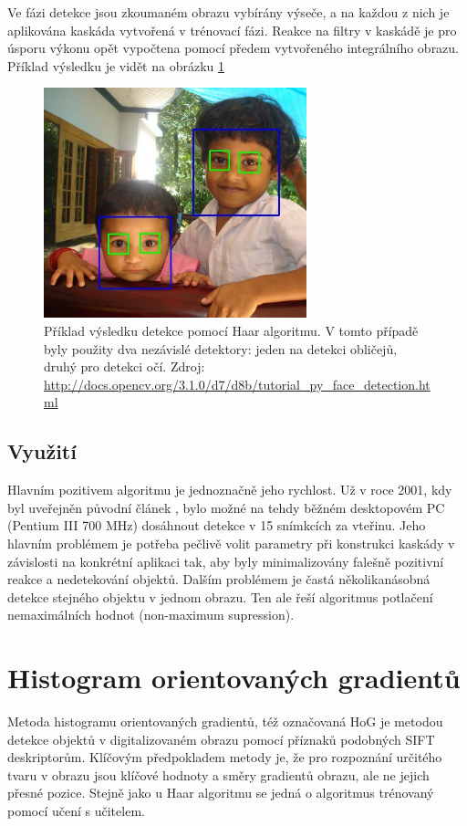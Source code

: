 	Ve fázi detekce jsou zkoumaném obrazu vybírány výseče, a na každou z nich je aplikována kaskáda vytvořená v trénovací fázi. Reakce na filtry v kaskádě je pro úsporu výkonu opět vypočtena pomocí předem vytvořeného integrálního obrazu.	Příklad výsledku je vidět na obrázku \ref{haar_detected}
	

	
	\begin{figure}[!ht] 
		\centering
			\includegraphics[width=3in]{img/haar_detected.jpg}
		\caption{Příklad výsledku detekce pomocí Haar algoritmu. V tomto případě byly použity dva nezávislé detektory: jeden na detekci obličejů, druhý pro detekci očí. 
		Zdroj:		 \protect\url{http://docs.opencv.org/3.1.0/d7/d8b/tutorial_py_face_detection.html}
		}	
		\label{haar_detected}
	\end{figure} 
	
	\subsection{Využití}
	
	Hlavním pozitivem algoritmu je jednoznačně jeho rychlost. Už v roce 2001, kdy byl uveřejněn původní článek \cite{viola2001rapid}, bylo možné na tehdy běžném desktopovém PC (Pentium III 700 MHz) dosáhnout detekce v 15 snímkcích za vteřinu. Jeho hlavním problémem je potřeba pečlivě volit parametry při konstrukci kaskády v závislosti na konkrétní aplikaci tak, aby byly minimalizovány falešně pozitivní reakce a nedetekování objektů. Dalším problémem je častá několikanásobná detekce stejného objektu v jednom obrazu. Ten ale řeší algoritmus potlačení nemaximálních hodnot (non-maximum supression).
 
\section{Histogram orientovaných gradientů}
\label{sec:hog}
	Metoda histogramu orientovaných gradientů, též označovaná HoG \cite{dalal2005histograms} je metodou detekce objektů v digitalizovaném obrazu pomocí příznaků podobných SIFT deskriptorům. Klíčovým předpokladem metody je, že pro rozpoznání určitého tvaru v obrazu jsou klíčové hodnoty a směry gradientů obrazu, ale ne jejich přesné pozice. Stejně jako u Haar algoritmu se jedná o algoritmus trénovaný pomocí učení s učitelem.
	
